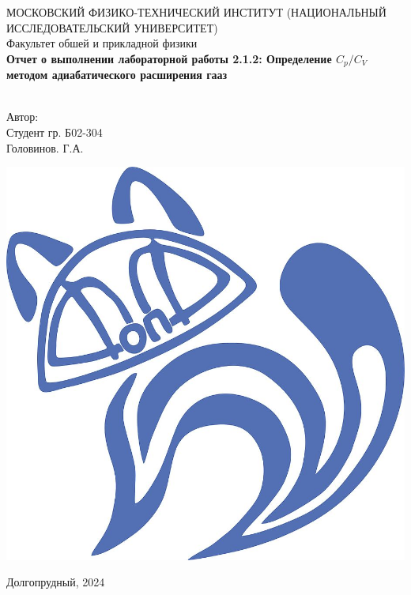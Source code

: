 \begin{titlepage}
	\begin{center}
		МОСКОВСКИЙ ФИЗИКО-ТЕХНИЧЕСКИЙ ИНСТИТУТ (НАЦИОНАЛЬНЫЙ ИССЛЕДОВАТЕЛЬСКИЙ УНИВЕРСИТЕТ) \\
		
		
		\hfill \break
		Факультет обшей и прикладной физики\\
		\vspace{2.5cm}
		\large{\textbf{Отчет о выполнении лабораторной работы 2.1.2: Определение $C_p/C_V$ методом адиабатического расширения гааз}}\\
		\hfill \break
		\\
	\end{center}
	
	\begin{flushright}
		Автор:\\
		Студент гр. Б02-304\\
		Головинов. Г.А.
	\end{flushright}
	
	\vfill
	
	\begin{center}
		\includegraphics[width=0.15\linewidth]{uni}
	\end{center}
	
	
	
	
	\begin{center} Долгопрудный, 2024 \end{center}
	
	\thispagestyle{empty}
	
\end{titlepage}